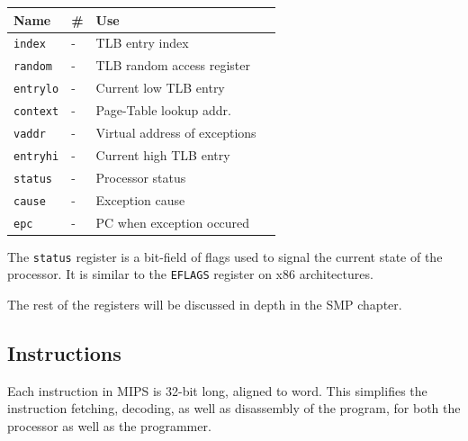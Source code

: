 \begin{center}
    \begin{tabular}{ | l | l | l | c |}
    \hline
	\textbf{Name} & \textbf{\#} & \textbf{Use} \\ \hline \hline
	\texttt{index}		& -	& TLB entry index\\ \hline
	\texttt{random}		& -	& TLB random access register \\ \hline
	\texttt{entrylo}	& -	& Current low TLB entry \\
	\hline
	\texttt{context}	& -	& Page-Table lookup addr. \\ \hline
	\texttt{vaddr}		& -	& Virtual address of exceptions
	\\ \hline
	\texttt{entryhi}	& -	& Current high TLB entry\\
	\hline
	\texttt{status}		& -	& Processor status \\ \hline
	\texttt{cause}		& -	& Exception cause \\ \hline
	\texttt{epc}		& -	& PC when exception occured \\ \hline
    \end{tabular}
\end{center}
The \texttt{status} register is a bit-field of flags used to signal the
current
state of the processor. It is similar to the \texttt{EFLAGS} register on
x86 architectures.

The rest of the registers will be discussed in depth in the SMP chapter.


\subsection{Instructions}
Each instruction in MIPS is 32-bit long, aligned to word. This simplifies the
instruction fetching, decoding, as well as disassembly of the program,
for both
the processor as well as the programmer.

